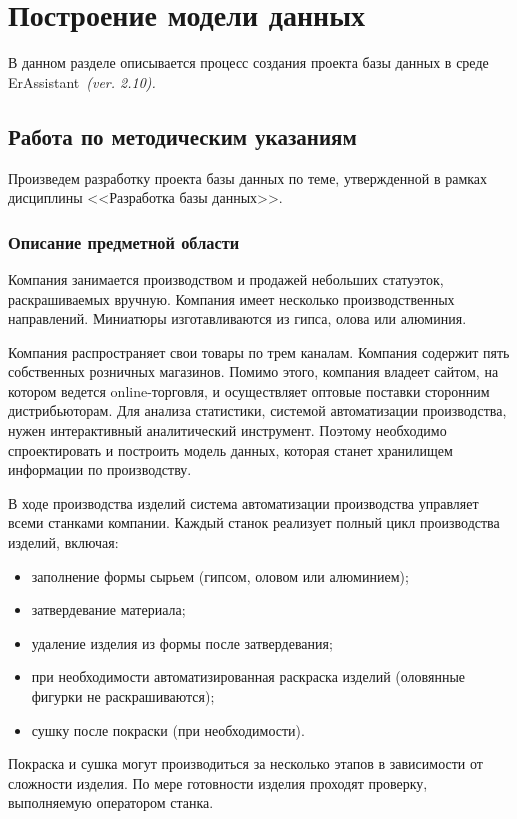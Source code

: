 \newcommand{\erassistant}{ErAssistant~}

\chapter{Построение модели данных}
\label{cha:analysis}
%
%
В данном разделе описывается процесс создания проекта базы данных в среде \erassistant \textit{(ver. 2.10).}

\section{Работа по методическим указаниям}
Произведем разработку проекта базы данных по теме, утвержденной в рамках дисциплины <<Разработка базы данных>>.
\subsection{Описание предметной области}
Компания занимается производством и продажей небольших статуэток,
раскрашиваемых вручную. Компания имеет несколько производственных
направлений. Миниатюры изготавливаются из гипса, олова или алюминия.

Компания распространяет свои товары по трем каналам. Компания содержит
пять собственных розничных магазинов. Помимо этого, компания владеет
сайтом, на котором ведется online-торговля, и осуществляет оптовые поставки
сторонним
дистрибьюторам.
Для
анализа
статистики,
системой автоматизации производства, нужен интерактивный аналитический
инструмент. Поэтому необходимо спроектировать и построить модель данных,
которая станет хранилищем информации по производству.

В ходе производства изделий система автоматизации производства
управляет всеми станками компании. Каждый станок реализует полный цикл
производства изделий, включая:
\begin{itemize}
	\item заполнение формы сырьем (гипсом, оловом или алюминием);
	\item затвердевание материала;
	\item  удаление изделия из формы после затвердевания;
	\item при необходимости автоматизированная раскраска изделий (оловянные фигурки не раскрашиваются);
	\item сушку после покраски (при необходимости).
\end{itemize}


Покраска и сушка могут производиться за несколько этапов в зависимости
от сложности изделия. По мере готовности изделия проходят проверку,
выполняемую оператором станка.

